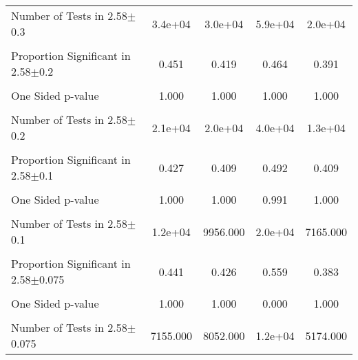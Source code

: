 {\begin{tabular}{l*{4}{c}}
Number of Tests in 2.58$\pm$0.3&  3.4e+04         &  3.0e+04         &  5.9e+04         &  2.0e+04         \\
                &                  &                  &                  &                  \\
\hline Proportion Significant in 2.58$\pm$0.2&    0.451         &    0.419         &    0.464         &    0.391         \\
                &                  &                  &                  &                  \\
One Sided p-value&    1.000         &    1.000         &    1.000         &    1.000         \\
                &                  &                  &                  &                  \\
Number of Tests in 2.58$\pm$0.2&  2.1e+04         &  2.0e+04         &  4.0e+04         &  1.3e+04         \\
                &                  &                  &                  &                  \\
\hline Proportion Significant in 2.58$\pm$0.1&    0.427         &    0.409         &    0.492         &    0.409         \\
                &                  &                  &                  &                  \\
One Sided p-value&    1.000         &    1.000         &    0.991         &    1.000         \\
                &                  &                  &                  &                  \\
Number of Tests in 2.58$\pm$0.1&  1.2e+04         & 9956.000         &  2.0e+04         & 7165.000         \\
                &                  &                  &                  &                  \\
\hline Proportion Significant in 2.58$\pm$0.075&    0.441         &    0.426         &    0.559         &    0.383         \\
                &                  &                  &                  &                  \\
One Sided p-value&    1.000         &    1.000         &    0.000         &    1.000         \\
                &                  &                  &                  &                  \\
Number of Tests in 2.58$\pm$0.075& 7155.000         & 8052.000         &  1.2e+04         & 5174.000         \\

\end{tabular}}
